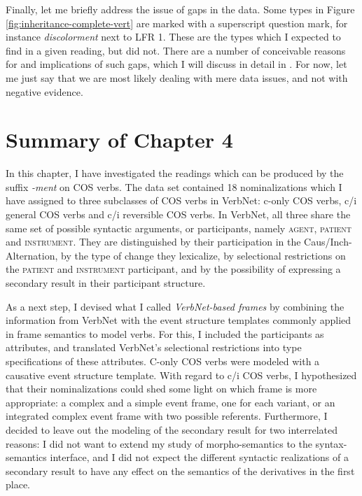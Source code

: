 Finally, let me briefly address the issue of gaps in the data. Some types in Figure \ref{fig:inheritance-complete-vert} are marked with a superscript question mark, for instance \textit{discolorment} next to LFR 1. These are the types which I expected to find in a given reading, but did not. There are a number of conceivable reasons for and implications of such gaps, which I will discuss in detail in . 
For now, let me just say that we are most likely dealing with mere data issues, and not with negative evidence.  

\section{Summary of Chapter 4} \label{sec:cos-summary} 


In this chapter, I have investigated the readings which can be produced by the suffix \textit{-ment} on COS verbs. The data set contained 18 nominalizations which I have assigned to three subclasses of COS verbs in VerbNet: c-only COS verbs, c/i general COS verbs and c/i reversible COS verbs. In VerbNet, all three share the same set of possible syntactic arguments, or participants, namely \textsc{agent, patient} and \textsc{instrument}. They are distinguished by their participation in the Caus/Inch-Alternation, by the type of change they lexicalize, by selectional restrictions on the \textsc{patient} and \textsc{instrument} participant, and by the possibility of expressing a secondary result in their participant structure. 

As a next step, I devised what I called \textit{VerbNet-based frames} by combining the information from VerbNet with the event structure templates commonly applied in frame semantics to model verbs. For this, I included the participants as attributes, and translated VerbNet's selectional restrictions into type specifications of these attributes. 
C-only COS verbs were modeled with a causative event structure template. With regard to c/i COS verbs, I hypothesized that their nominalizations could shed some light on which frame is more appropriate: a complex and a simple event frame, one for each variant, or an integrated complex event frame with two possible referents.
Furthermore, I decided to leave out the modeling of the secondary result for two interrelated reasons: I did not want to extend my study of morpho-semantics to the syntax-semantics interface, and I did not expect the different syntactic realizations of a secondary result to have any effect on the semantics of the derivatives in the first place.

